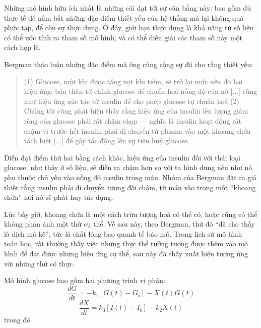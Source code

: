 \documentclass[12pt, openany]{book}
\theoremstyle{exercise}
\begin{document}
Những mô hình hữu ích nhất là những cái đạt tới sự cân bằng này: bao gồm đủ thực tế để nắm bắt những đặc điểm thiết yếu của hệ thống mà lại không quá phức tạp, để còn sự thực dụng. Ở đây, giới hạn thực dụng là khả năng từ số liệu có thể ước tính ra tham số mô hình, và có thể diễn giải các tham số này một cách hợp lẽ.


Bergman thảo luận những đặc điểm mà ông cùng cộng sự đã cho rằng thiết yếu:

\begin{quote}
(1) Glucose, một khi được tăng vọt khi tiêm, sẽ trở lại mức nền do
hai hiệu ứng: bản thân từ chính glucose để chuẩn hoá nồng độ
của nó [...] cũng như hiệu ứng xúc tác từ insulin để cho phép
glucose tự chuẩn hoá (2) Chúng tôi cũng phát hiện thấy rằng
hiệu ứng của insulin lên lượng giảm ròng của glucose
phải rất chậm chạp --- nghĩa là insulin hoạt động rất chậm vì 
trước hết insulin phải di chuyển từ plasma vào một khoang chứa tách biệt [...] để gây tác động lên sự tiêu huỷ glucose.
\end{quote}

Diễn đạt điểm thứ hai bằng cách khác, hiệu ứng của insulin đối với thải loại glucose, như thấy ở số liệu, sẽ diễn ra chậm hơn so với ta hình dung nếu như nó phụ thuộc chủ yếu vào nồng độ insulin trong máu.  Nhóm của Bergman đặt ra giả thiết rằng insulin phải di chuyển tương đối chậm, từ máu vào trong một ``khoang chứa'' nơi nó sẽ phát huy tác dụng.


Lúc bấy giờ, khoang chứa là một cách trừu tượng hoá có thể có, hoặc cũng có thể không phản ánh một thứ cụ thể. Về sau này, theo Bergman, thứ đó ``đã cho thấy là dịch mô kẽ'', tức là chất lỏng bao quanh tế bào mô. Trong lịch sử mô hình toán học, rất thường thấy việc những thực thể tưởng tượng được thêm vào mô hình để đạt được những hiệu ứng cụ thể, sau này đã thấy xuất hiện tương ứng với những thứ có thực.


Mô hình glucose bao gồm hai phương trình vi phân:
%
\[ \frac{dG}{dt} = -k_1 \left[ G(t) - G_b \right] - X(t) G(t)  \]
%
\[ \frac{dX}{dt} = k_3 \left[I(t) - I_b \right] - k_2 X(t) \]
%
trong đó
\end{document}
